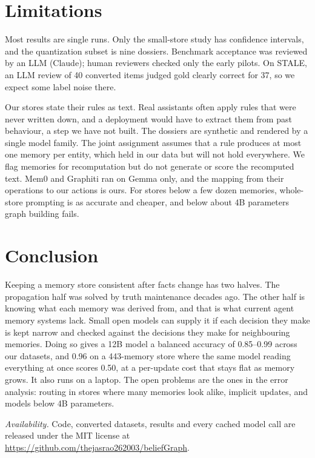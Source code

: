 \documentclass[conference]{IEEEtran}
\begin{document}
\section{Limitations}

Most results are single runs. Only the small-store study has confidence intervals, and the quantization subset is nine dossiers. Benchmark acceptance was reviewed by an LLM (Claude); human reviewers checked only the early pilots. On STALE, an LLM review of 40 converted items judged gold clearly correct for 37, so we expect some label noise there.

Our stores state their rules as text. Real assistants often apply rules that were never written down, and a deployment would have to extract them from past behaviour, a step we have not built. The dossiers are synthetic and rendered by a single model family. The joint assignment assumes that a rule produces at most one memory per entity, which held in our data but will not hold everywhere. We flag memories for recomputation but do not generate or score the recomputed text. Mem0 and Graphiti ran on Gemma only, and the mapping from their operations to our actions is ours. For stores below a few dozen memories, whole-store prompting is as accurate and cheaper, and below about 4B parameters graph building fails.

\section{Conclusion}

Keeping a memory store consistent after facts change has two halves. The propagation half was solved by truth maintenance decades ago. The other half is knowing what each memory was derived from, and that is what current agent memory systems lack. Small open models can supply it if each decision they make is kept narrow and checked against the decisions they make for neighbouring memories. Doing so gives a 12B model a balanced accuracy of 0.85--0.99 across our datasets, and 0.96 on a 443-memory store where the same model reading everything at once scores 0.50, at a per-update cost that stays flat as memory grows. It also runs on a laptop. The open problems are the ones in the error analysis: routing in stores where many memories look alike, implicit updates, and models below 4B parameters.

\textit{Availability.} Code, converted datasets, results and every cached model call are released under the MIT license at \url{https://github.com/thejasrao262003/beliefGraph}.

\balance


\end{document}
